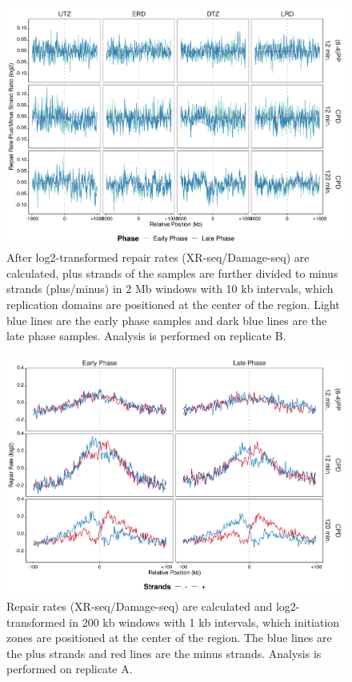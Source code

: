 \begin{figure}[H]
\begin{center}
\includegraphics[width=\textwidth]{Chapters/7_appendix/figures/supfig35}
\caption[Repair rate plus/minus phase ratio of replication domains in 2 Mb (replicate B).]{After log2-transformed repair rates (XR-seq/Damage-seq) are calculated, plus strands of the samples are further divided to minus strands (plus/minus) in 2 Mb windows with 10 kb intervals, which replication domains are positioned at the center of the region. Light blue lines are the early phase samples and dark blue lines are the late phase samples. Analysis is performed on replicate B.}
\label{supfig:rrpm2000repdomainB}
\end{center}
\end{figure}

\begin{figure}[H]
\begin{center}
\includegraphics[width=\textwidth]{Chapters/7_appendix/figures/supfig36}
\caption[Repair rate of initiation zones in 200 kb (replicate A).]{Repair rates (XR-seq/Damage-seq) are calculated and log2-transformed in 200 kb windows with 1 kb intervals, which initiation zones are positioned at the center of the region. The blue lines are the plus strands and red lines are the minus strands. Analysis is performed on replicate A.}
\label{supfig:rr200inzonesA}
\end{center}
\end{figure}

